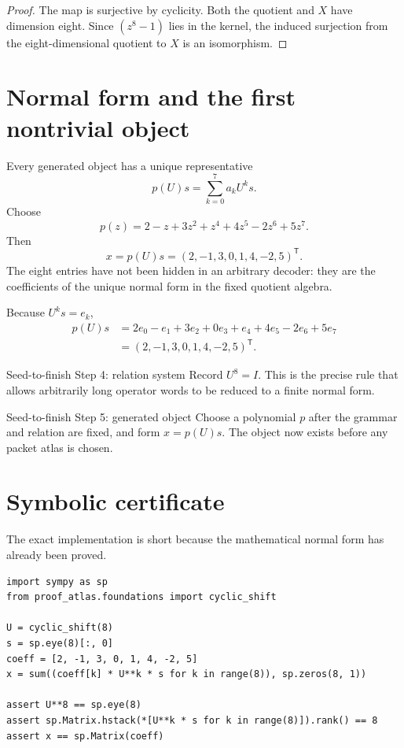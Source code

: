 \begin{proof}
The map is surjective by cyclicity.  Both the quotient and $X$ have dimension eight.  Since $(z^8-1)$ lies in the kernel, the induced surjection from the eight-dimensional quotient to $X$ is an isomorphism.
\end{proof}


\section{Normal form and the first nontrivial object}
Every generated object has a unique representative
\[
p(U)s
=
\sum_{k=0}^7a_kU^ks.
\]
Choose
\[
p(z)=2-z+3z^2+z^4+4z^5-2z^6+5z^7.
\]
Then
\[
\boxed{
x=p(U)s=(2,-1,3,0,1,4,-2,5)^{\mathsf T}.
}
\]
The eight entries have not been hidden in an arbitrary decoder: they are the coefficients of the unique normal form in the fixed quotient algebra.

\begin{calculationbox}
Because $U^ks=e_k$,
\[
\begin{aligned}
p(U)s
&=2e_0-e_1+3e_2+0e_3+e_4+4e_5-2e_6+5e_7\\
&=(2,-1,3,0,1,4,-2,5)^{\mathsf T}.
\end{aligned}
\]
\end{calculationbox}

\begin{stepbox}{Seed-to-finish Step 4: relation system}
Record $U^8=I$.  This is the precise rule that allows arbitrarily long operator words to be reduced to a finite normal form.
\end{stepbox}

\begin{stepbox}{Seed-to-finish Step 5: generated object}
Choose a polynomial $p$ after the grammar and relation are fixed, and form $x=p(U)s$.  The object now exists before any packet atlas is chosen.
\end{stepbox}

\section{Symbolic certificate}
The exact implementation is short because the mathematical normal form has already been proved.
\begin{lstlisting}
import sympy as sp
from proof_atlas.foundations import cyclic_shift

U = cyclic_shift(8)
s = sp.eye(8)[:, 0]
coeff = [2, -1, 3, 0, 1, 4, -2, 5]
x = sum((coeff[k] * U**k * s for k in range(8)), sp.zeros(8, 1))

assert U**8 == sp.eye(8)
assert sp.Matrix.hstack(*[U**k * s for k in range(8)]).rank() == 8
assert x == sp.Matrix(coeff)
\end{lstlisting}

